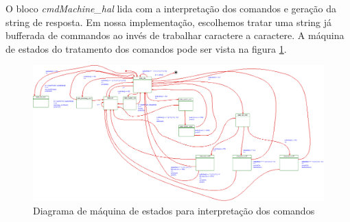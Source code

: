 \documentclass{article}
\begin{document}
O bloco \textit{cmdMachine\_hal} lida com a interpretação dos comandos e geração da string de resposta. Em nossa implementação, escolhemos tratar uma string já bufferada de commandos ao invés de trabalhar caractere a caractere. A máquina de estados do tratamento dos comandos pode ser vista na figura \ref{fig:estados}.

\begin{figure}[H]
	\centering
	\includegraphics[width=1.5\linewidth, center]{estados}
	\caption{Diagrama de máquina de estados para interpretação dos comandos}
	\label{fig:estados}
\end{figure}
\end{document}
